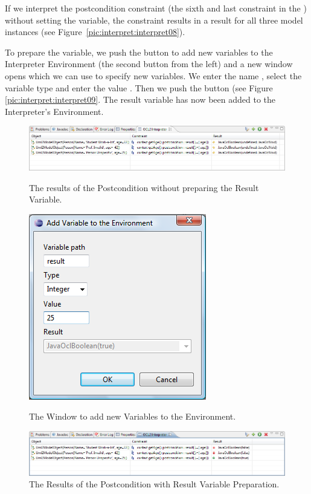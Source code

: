 If we interpret the postcondition constraint (the sixth and last constraint in the ) without setting the  variable, the constraint results in a  result for all three model instances (see Figure~\ref{pic:interpret:interpret08}).

To prepare the variable, we push the button to add new variables to the Interpreter Environment (the second button from the left) and a new window opens which we can use to specify new variables. We enter the name , select the variable type  and enter the value . Then we push the  button (see Figure \ref{pic:interpret:interpret09}. The result variable has now been added to the Interpreter's Environment.

\begin{figure}[!p]
	\centering
	\includegraphics[width=1.0\linewidth]{figures/interpreter/interpret08}
	\caption{The results of the Postcondition without preparing the Result Variable.}
	\label{pic:interpret:interpret08}

  \vspace{3.0em}
	
	\centering
	\includegraphics[width=0.5\linewidth]{figures/interpreter/interpret09}
	\caption{The Window to add new Variables to the Environment.}
	\label{pic:interpret:interpret09}

  \vspace{3.0em}
	
	\centering
	\includegraphics[width=1.0\linewidth]{figures/interpreter/interpret10}
	\caption{The Results of the Postcondition with Result Variable Preparation.}
	\label{pic:interpret:interpret10}
	

\end{figure}
